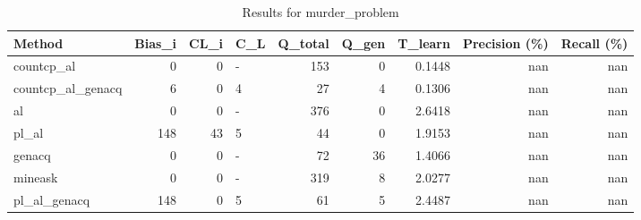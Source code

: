 \begin{table}[ht]
\caption{Results for murder_problem}
\begin{tabular}{lrrlrrrrr}
\hline
 Method            &   Bias\_i &   CL\_i & C\_L   &   Q\_total &   Q\_gen &   T\_learn &   Precision (\%) &   Recall (\%) \\
\hline
 countcp\_al        &        0 &      0 & -     &       153 &       0 &    0.1448 &             nan &          nan \\
 countcp\_al\_genacq &        6 &      0 & 4     &        27 &       4 &    0.1306 &             nan &          nan \\
 al                &        0 &      0 & -     &       376 &       0 &    2.6418 &             nan &          nan \\
 pl\_al             &      148 &     43 & 5     &        44 &       0 &    1.9153 &             nan &          nan \\
 genacq            &        0 &      0 & -     &        72 &      36 &    1.4066 &             nan &          nan \\
 mineask           &        0 &      0 & -     &       319 &       8 &    2.0277 &             nan &          nan \\
 pl\_al\_genacq      &      148 &      0 & 5     &        61 &       5 &    2.4487 &             nan &          nan \\
\hline
\end{tabular}
\end{table}